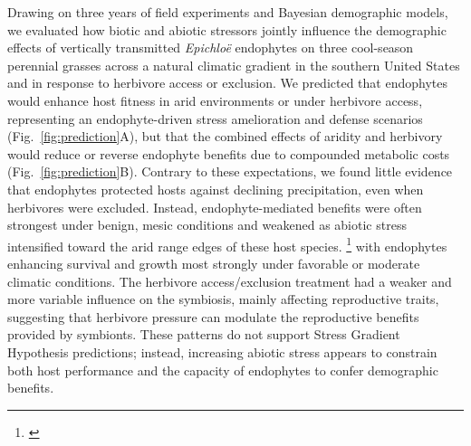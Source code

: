 \documentclass[12pt]{article}\usepackage[]{graphicx}\usepackage[dvipsnames]{xcolor}
\newcommand{\tom}[2]{{\color{red}{#1}}\footnote{\textit{\color{red}{#2}}}}
\begin{document}
Drawing on three years of field experiments and Bayesian demographic models, we evaluated how biotic and abiotic stressors jointly influence the demographic effects of vertically transmitted \textit{Epichloë} endophytes on three cool-season perennial grasses across a natural climatic gradient in the southern United States and in response to herbivore access or exclusion.  
We predicted that endophytes would enhance host fitness in arid environments or under herbivore access, representing an endophyte-driven stress amelioration and defense scenarios (Fig.~\ref{fig:prediction}A), but that the combined effects of aridity and herbivory would reduce or reverse endophyte benefits due to compounded metabolic costs (Fig.~\ref{fig:prediction}B).  
Contrary to these expectations, we found little evidence that endophytes protected hosts against declining precipitation, even when herbivores were excluded.  
Instead, endophyte-mediated benefits were often strongest under benign, mesic conditions and weakened as abiotic stress intensified toward the arid range edges of these host species.  
\tom{Model comparisons confirmed that the effects of endophytes on host fitness were primarily shaped by climate,}{For two our of four vital rates, the symbiont*herbivory model was best, so this statement that endo effects are primarily shaped by climate does not feel well supported.} with endophytes enhancing survival and growth most strongly under favorable or moderate climatic conditions. 
The herbivore access/exclusion treatment had a weaker and more variable influence on the symbiosis, mainly affecting reproductive traits, suggesting that herbivore pressure can modulate the reproductive benefits provided by symbionts.
These patterns do not support Stress Gradient Hypothesis predictions; instead, increasing abiotic stress appears to constrain both host performance and the capacity of endophytes to confer demographic benefits.
\end{document}
